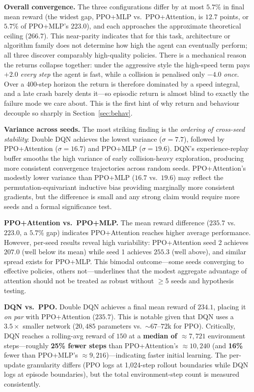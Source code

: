 \documentclass[conference]{IEEEtran}
\begin{document}
\textbf{Overall convergence.} The three configurations differ by at most
$5.7\%$ in final mean reward (the widest gap, PPO+MLP vs.\ PPO+Attention, is
$12.7$ points, or $5.7\%$ of PPO+MLP's $223.0$), and each
approaches the approximate theoretical ceiling ($266.7$). This near-parity
indicates that for this task, architecture or algorithm family does not
determine how high the agent can eventually perform; all three discover
comparably high-quality policies. There is a mechanical reason the returns
collapse together: under the aggressive style the high-speed term pays $+2.0$
\emph{every step} the agent is fast, while a collision is penalised only $-4.0$
\emph{once}. Over a 400-step horizon the return is therefore dominated by a
speed integral, and a late crash barely dents it---so episodic return is almost
blind to exactly the failure mode we care about. This is the first hint of why
return and behaviour decouple so sharply in Section~\ref{sec:behav}.

\textbf{Variance across seeds.} The most striking finding is the
\emph{ordering of cross-seed stability}: Double DQN achieves the lowest
variance ($\sigma=7.7$), followed by PPO+Attention ($\sigma=16.7$) and
PPO+MLP ($\sigma=19.6$). DQN's experience-replay buffer smooths the high
variance of early collision-heavy exploration, producing more consistent
convergence trajectories across random seeds. PPO+Attention's modestly lower
variance than PPO+MLP ($16.7$ vs.\ $19.6$) may reflect the permutation-equivariant
inductive bias providing marginally more consistent gradients, but the
difference is small and any strong claim would require more seeds and a
formal significance test.

\textbf{PPO+Attention vs.\ PPO+MLP.} The mean reward difference ($235.7$
vs.\ $223.0$, a $5.7\%$ gap) indicates PPO+Attention reaches higher average
performance. However, per-seed results reveal high variability: PPO+Attention
seed 2 achieves $207.0$ (well below its mean) while seed 1 achieves $255.3$
(well above), and similar spread exists for PPO+MLP. This bimodal outcome---some
seeds converging to effective policies, others not---underlines that the modest
aggregate advantage of attention should not be treated as robust without
$\geq$5 seeds and hypothesis testing.

\textbf{DQN vs.\ PPO.} Double DQN achieves a final mean reward of $234.1$,
placing it \emph{on par} with PPO+Attention ($235.7$). This is notable given
that DQN uses a $3.5\times$ smaller network ($20{,}485$ parameters vs.\
${\sim}67$--$72$k for PPO). Critically, DQN reaches a rolling-avg reward of
$150$ at a \textbf{median of ${\approx}7{,}721$} environment steps---roughly
\textbf{25\% fewer steps} than PPO+Attention's ${\approx}10{,}240$ (and
\textbf{16\%} fewer than PPO+MLP's ${\approx}9{,}216$)---indicating
faster initial learning. The per-update granularity differs (PPO logs at
1,024-step rollout boundaries while DQN logs at episode boundaries), but the
total environment-step count is measured consistently.
\end{document}
